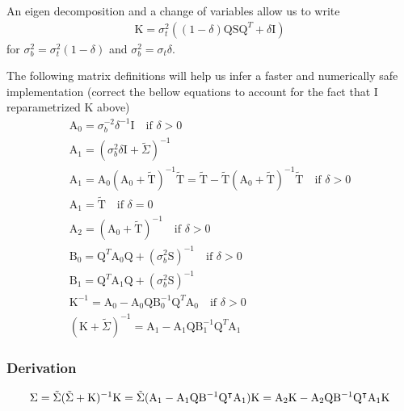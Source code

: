 An eigen decomposition and a change of variables allow us to write
\begin{align*}
\mathrm K = \sigma_t^2  ((1-\delta)\mathrm Q \mathrm S \mathrm Q^{T} + \delta \mathrm I)
\end{align*}
for $\sigma_b^2=\sigma_t^2(1-\delta)$ and $\sigma_b^2 = \sigma_t \delta$.

The following matrix definitions will help us infer a faster and numerically
safe implementation (correct the bellow equations to account for the fact that I
reparametrized K above)
\begin{align*}
\mathrm A_0 = \sigma_b^{-2} \delta^{-1} \mathrm I \quad \text{if }\delta > 0\\
\mathrm A_1 = (\sigma_b^2 \delta \mathrm I + \tilde\Sigma)^{-1}\\
\mathrm A_1 = \mathrm A_0 (\mathrm A_0 + \tilde{\mathrm T})^{-1} \tilde{\mathrm T} = \tilde{\mathrm T} - \tilde{\mathrm T} (\mathrm A_0 + \tilde{\mathrm T})^{-1} \tilde{\mathrm T} \quad \text{if }\delta > 0\\
\mathrm A_1 = \tilde{\mathrm T} \quad \text{if } \delta = 0\\
\mathrm A_2 = (\mathrm A_0 + \tilde{\mathrm T})^{-1} \quad \text{if } \delta > 0\\
\mathrm B_0 = \mathrm Q^T \mathrm A_0 \mathrm Q + (\sigma_b^2 \mathrm S)^{-1} \quad \text{if } \delta > 0\\
\mathrm B_1 = \mathrm Q^T \mathrm A_1 \mathrm Q + (\sigma_b^2 \mathrm S)^{-1}\\
\mathrm K^{-1} = \mathrm A_0 - \mathrm A_0 \mathrm Q \mathrm B_0^{-1} \mathrm Q^T \mathrm A_0 \quad \text{if } \delta > 0\\
(\mathrm K + \tilde{\Sigma})^{-1} = \mathrm A_1 - \mathrm A_1 \mathrm Q\mathrm B_1^{-1} \mathrm Q^T \mathrm A_1
\end{align*}

\subsubsection{Derivation}

\begin{align*}
\Sigma = \tilde{\Sigma} (\tilde{\Sigma} + \mathrm K)^{-1} \mathrm K = \tilde{\Sigma} (\mathrm A_1 - \mathrm A_1 \mathrm Q \mathrm B^{-1}\mathrm Q^\intercal \mathrm A_1) \mathrm K
= \mathrm A_2 \mathrm K - \mathrm A_2 \mathrm Q
          \mathrm B^{-1}\mathrm Q^\intercal \mathrm A_1 \mathrm K
\end{align*}


